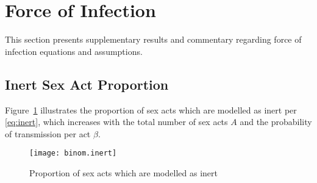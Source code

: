\section{Force of Infection}\label{sr.foi}
This section presents supplementary results and commentary regarding
force of infection equations and assumptions.
\subsection{Inert Sex Act Proportion}\label{sr.foi.inert}
Figure~\ref{fig:binom.inert} illustrates
the proportion of sex acts which are modelled as inert per \eqref{eq:inert}, which increases with
the total number of sex acts $A$ and
the probability of transmission per act $\beta$.
\begin{figure}[h]
  \centering\texttt{[image: binom.inert]}
  \caption{Proportion of sex acts which are modelled as inert}
    \label{fig:binom.inert}
\end{figure}

